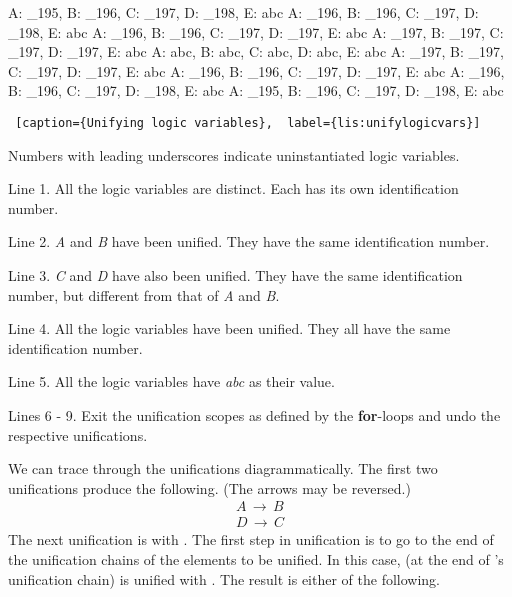 \begin{minipage}{\linewidth} \largev   \hrulefill
\begin{python}[numbers=left]
A: _195, B: _196, C: _197, D: _198, E: abc
A: _196, B: _196, C: _197, D: _198, E: abc
A: _196, B: _196, C: _197, D: _197, E: abc
A: _197, B: _197, C: _197, D: _197, E: abc
A: abc, B: abc, C: abc, D: abc, E: abc
A: _197, B: _197, C: _197, D: _197, E: abc
A: _196, B: _196, C: _197, D: _197, E: abc
A: _196, B: _196, C: _197, D: _198, E: abc
A: _195, B: _196, C: _197, D: _198, E: abc
\end{python}
\begin{lstlisting} [caption={Unifying logic variables},  label={lis:unifylogicvars}]
\end{lstlisting}
\end{minipage}

Numbers with leading underscores indicate uninstantiated logic variables. 

Line 1. All the logic variables are distinct. Each has its own identification number.

Line 2. \textit{A} and \textit{B} have been unified. They have the same identification number.

Line 3. \textit{C} and \textit{D} have also been unified. They have the same identification number, but different from that of \textit{A} and \textit{B}.

Line 4. All the logic variables have been unified. They all have the same identification number.

Line 5. All the logic variables have \textit{abc} as their value.

Lines 6 - 9. Exit the unification scopes as defined by the \textbf{for}-loops and undo the respective unifications.

We can trace through the unifications diagrammatically. The first two unifications produce the following. (The arrows may be reversed.)
\begin{equation}\label{eq:one}
\begin{split}
A \,\to\, B \\
D \,\to\, C 
\end{split}
\end{equation}
The next unification is  with . The first step in unification is to go to the end of the unification chains of the elements to be unified. In this case,  (at the end of 's unification chain) is unified with . The result is either of the following.

